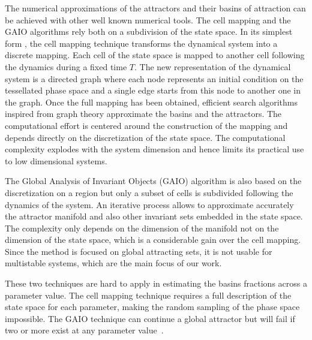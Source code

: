 \documentclass[9pt,twoside,lineno]{pnas-new}
\begin{document}
The numerical approximations of the attractors and their basins of attraction can be achieved with other well known numerical tools. The cell mapping and the GAIO algorithms rely both on a subdivision of the state space. In its simplest form \cite{sun2018cell}, the cell mapping technique transforms the dynamical system into a discrete mapping. Each cell of the state space is mapped to another cell following the dynamics during a fixed time $T$. The new representation of the dynamical system is a directed graph where each node represents an initial condition on the tessellated phase space and a single edge starts from this node to another one in the graph. Once the full mapping has been obtained, efficient search algorithms inspired from graph theory approximate the basins and the attractors. The computational effort is centered around the construction of the mapping and depends directly on the discretization of the state space. The computational complexity explodes with the system dimension and hence limits its practical use to low dimensional systems.

The Global Analysis of Invariant Objects (GAIO) algorithm \cite{dellnitz2001algorithms} is also based on the discretization on a region but only a subset of cells is subdivided following the dynamics of the system. An iterative process allows to approximate accurately the attractor manifold and also other invariant sets embedded in the state space. The complexity only depends on the dimension of the manifold not on the dimension of the state space, which is a considerable gain over the cell mapping. Since the method is focused on global attracting sets, it is not usable for multistable systems, which are the main focus of our work.

These two techniques are hard to apply in estimating the basins fractions across a parameter value. The cell mapping technique requires a full description of the state space for each parameter, making the random sampling of the phase space impossible. The GAIO technique can continue a global attractor but will fail if two or more exist at any parameter value~\cite{gerlach2020set}.



\end{document}
